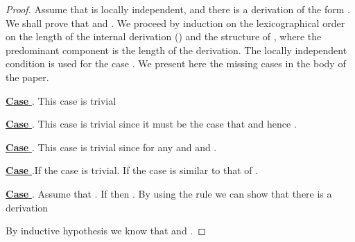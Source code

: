\documentclass{tlp}
\begin{document}
\begin{proof} 
Assume that    is locally independent,  and there is a derivation of the form  . We shall prove that  and
. 
	We proceed by induction on the lexicographical order on the length of the internal derivation  ()  and the structure of  , where the predominant component is the length of the derivation. 
 The locally independent condition is used for the case .
 We present here the missing cases in the body of the paper. 

\noindent \underline{{\bf Case}  }. This case is trivial

\noindent \underline{{\bf Case}  }. This case is trivial since it must be the case that  and hence . 

\noindent \underline{{\bf Case}  }. This case is trivial since  for any  and  and . 


\noindent \underline{{\bf Case}  }.If   the case is trivial. If    the case is similar to that of . 




\noindent \underline{{\bf Case}  }.  Assume that 
.   If  then   . By using the rule  we can show that there is a derivation


By inductive hypothesis we know that  and 
. 

\end{proof}
\end{document}

